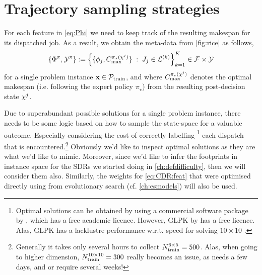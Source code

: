 \section{Trajectory sampling strategies}\label{sec:trdat:tracks}
For each feature in \cref{eq:Phi} we need to keep track of the resulting 
makespan for its dispatched job. 
As a result, we obtain the meta-data from 
\cref{fig:rice} as follows, 
\begin{equation}\label{eq:trdat:metadata}
\{\Phi^\pi,\mathcal{Y}^\pi\} := 
\condset{\{ \vphi_j, C_{\max}^{\pi_\star(\vchi^j)}
    \}}{J_j\in\mathcal{L}^{(k)}}_{k=1}^K \in \mathcal{F} \times \mathcal{Y}
\end{equation}
for a single problem instance $\mathbf{x}\in\mathcal{P}_{\text{train}}$, and where 
$C_{\max}^{\pi_\star({\mathbf{\chi}}^j)}$ denotes the optimal makespan (i.e. following 
the expert policy $\pi_\star$) from the resulting post-decision state ${\mathbf{\chi}}^j$.

Due to superabundant possible solutions for a single problem instance, 
there needs to be some logic based on how to sample the state-space for a 
valuable outcome. Especially considering the cost of correctly labelling 
\footnote{Optimal solutions can be obtained by using a commercial software 
    package by \citet{gurobi}, which has a free academic licence. However, GLPK 
    by \citet{glpk} has a free licence. Alas, GLPK has a lacklustre performance 
    w.r.t. speed for solving $10\times10$ \JSP.}
each dispatch that is encountered.\footnote{Generally it takes 
    only several hours to collect $N_{\text{train}}^{6\times5}=500$. Alas, when 
    going to higher dimension, $N_{\text{train}}^{10\times10}=300$ 
    really becomes an issue, as  needs a few days, and 
     or  require several weeks!}
Obviously we'd like to inspect optimal solutions as they are what we'd like to 
mimic. Moreover, since we'd like to infer the footprints in instance space for 
the SDRs we started doing in \cref{ch:defdifficulty}, then we will consider 
them also.
Similarly, the weights for \cref{eq:CDR:feat} that were optimised directly 
using from evolutionary search (cf. \cref{ch:esmodels}) will also be used.

